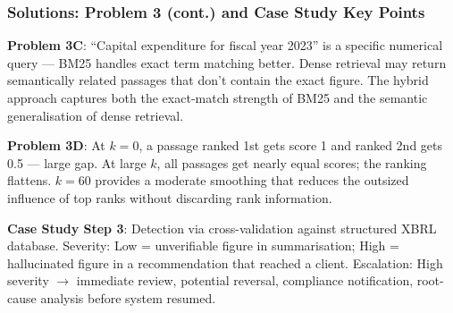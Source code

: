 \documentclass[9pt,t]{beamer}
\begin{document}
\begin{frame}
\frametitle{Solutions: Problem 3 (cont.) and Case Study Key Points}

\textbf{Problem 3C}: ``Capital expenditure for fiscal year 2023'' is a specific numerical query — BM25 handles exact term matching better. Dense retrieval may return semantically related passages that don't contain the exact figure. The hybrid approach captures both the exact-match strength of BM25 and the semantic generalisation of dense retrieval.

\medskip
\textbf{Problem 3D}: At $k=0$, a passage ranked 1st gets score 1 and ranked 2nd gets 0.5 — large gap. At large $k$, all passages get nearly equal scores; the ranking flattens. $k=60$ provides a moderate smoothing that reduces the outsized influence of top ranks without discarding rank information.

\medskip
\textbf{Case Study Step 3}: Detection via cross-validation against structured XBRL database. Severity: Low = unverifiable figure in summarisation; High = hallucinated figure in a recommendation that reached a client. Escalation: High severity $\to$ immediate review, potential reversal, compliance notification, root-cause analysis before system resumed.
\end{frame}
\end{document}
